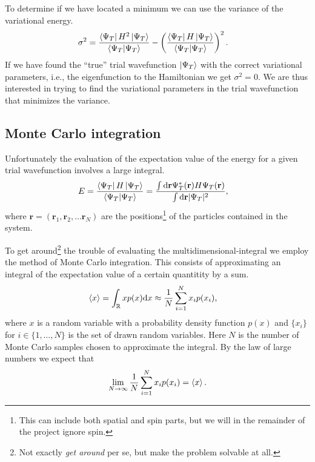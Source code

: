 \documentclass[
    a4paper, aps, twocolumn, floatfix, superscriptaddress,
    nofootinbib]{revtex4-1}
\newcommand{\vf}{\mathbf}
\newcommand{\1}{\mathds{1}}
\newcommand{\para}[1]{\left(#1\right)}
\begin{document}
    To determine if we have located a minimum we can use the variance of the
    variational energy.
    \begin{align}
        \sigma^2
        &=
        \frac{
            \bra{\Psi_T}H^2\ket{\Psi_T}
        }{
            \bra{\Psi_T}\ket{\Psi_T}
        }
        - \para{
            \frac{
                \bra{\Psi_T}H\ket{\Psi_T}
            }{
                \bra{\Psi_T}\ket{\Psi_T}
            }
        }^2.
    \end{align}
    If we have found the ``true'' trial wavefunction $\ket{\Psi_T}$ with the
    correct variational parameters, i.e., the eigenfunction to the Hamiltonian
    we get $\sigma^2 = 0$. We are thus interested in trying to find the
    variational parameters in the trial wavefunction that minimizes the
    variance.

    \subsection{Monte Carlo integration}
        Unfortunately the evaluation of the expectation value of the energy for
        a given trial wavefunction involves a large integral.
        \begin{align}
            E
            &= \frac{\bra{\Psi_T}H\ket{\Psi_T}}{\bra{\Psi_T}\ket{\Psi_T}}
            =
            \frac{\int\dd\vf{r}\Psi_T^{*}(\vf{r})H\Psi_T(\vf{r})}
            {\int\dd\vf{r}|\Psi_T|^2},
        \end{align}
        where $\vf{r} = (\vf{r}_1, \vf{r}_2, \dots \vf{r}_N)$ are the
        positions\footnote{This can include both spatial and spin parts, but we
        will in the remainder of the project ignore spin.} of the particles
        contained in the system.

        To get around\footnote{Not exactly \emph{get around} per se, but make
        the problem solvable at all.} the trouble of evaluating the
        multidimensional-integral we employ the method of Monte Carlo
        integration. This consists of approximating an integral of the
        expectation value of a certain quantitity by a sum.
        \begin{align}
            \expval{x}
            &=
            \int_{\mathbb{R}}xp(x)\dd x
            \approx
            \frac{1}{N}\sum_{i = 1}^N x_ip(x_i),
        \end{align}
        where $x$ is a random variable with a probability density function
        $p(x)$ and $\{x_i\}$ for $i \in \{1, \dots, N\}$ is the set of drawn
        random variables. Here $N$ is the number of Monte Carlo samples chosen
        to approximate the integral. By the law of large numbers we expect that
        \begin{align}
            \lim_{N \to \infty}\frac{1}{N}\sum_{i = 1}^N x_ip(x_i)
            = \expval{x}.
        \end{align}
\end{document}
